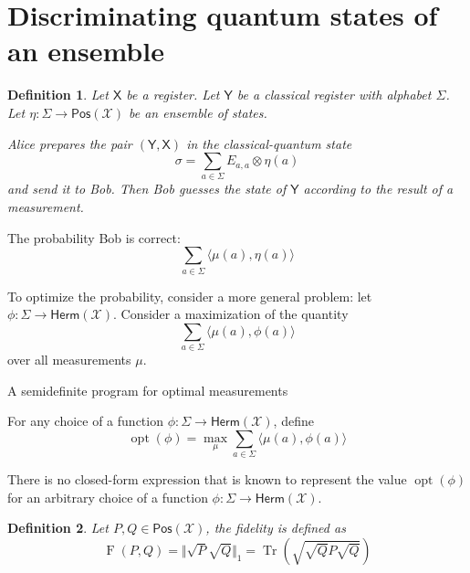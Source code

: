 \documentclass[aps,pra,onecolumn,notitlepage,superscriptaddress]{revtex4-1}
\newcommand{\reg}[1]{\mathsf{#1}}
\newcommand{\spc}[1]{\mathcal{#1}}
\newcommand{\Pos}{\mathsf{Pos}}
\newcommand{\Herm}{\mathsf{Herm}}
\def\>{\rangle}
\def\<{\langle}
\newcommand{\Tr}{\operatorname{Tr}}
\newcommand{\op}[1]{\operatorname{#1}}
\newtheorem{defi}{Definition}
\begin{document}
    \section{Discriminating quantum states of an ensemble}
    \begin{defi}
        Let $\reg{X}$ be a register. Let $\reg{Y}$ be a classical register with alphabet $\Sigma$. Let $\eta : \Sigma \to \Pos(\spc{X})$ be an ensemble of states.
        
        Alice prepares the pair $(\reg{Y}, \reg{X})$ in the classical-quantum state
        \begin{equation}
            \sigma = \sum_{a \in \Sigma} E_{a,a} \otimes \eta(a)
        \end{equation}
        and send it to Bob. Then Bob guesses the state of $\reg{Y}$ according to the result of a measurement.
    \end{defi}

    The probability Bob is correct:
    \begin{equation}
        \sum_{a \in \Sigma} \< \mu(a), \eta(a) \>
    \end{equation}

    To optimize the probability, consider a more general problem: let $\phi : \Sigma \to \Herm(\spc{X})$. Consider a maximization of the quantity
    \begin{equation}
        \sum_{a \in \Sigma} \< \mu(a), \phi(a) \>
    \end{equation}
    over all measurements $\mu$.

    A semidefinite program for optimal measurements

    For any choice of a function $\phi : \Sigma \to \Herm(\spc{X})$, define
    \begin{equation}
        \op{opt}(\phi) = \max_{\mu} \sum_{a \in \Sigma} \< \mu(a), \phi(a) \>
    \end{equation}

    There is no closed-form expression that is known to represent the value $\op{opt}(\phi)$ for an arbitrary choice of a function $\phi : \Sigma \to \Herm(\spc{X})$.

    \begin{defi}
        Let $P, Q \in \Pos(\spc X)$, the fidelity is defined as
        \begin{equation}
            \op F(P, Q) = \Vert \sqrt P \sqrt Q \Vert_1 = \Tr \left(\sqrt{\sqrt Q P \sqrt Q} \right)
        \end{equation}
    \end{defi}
\end{document}

